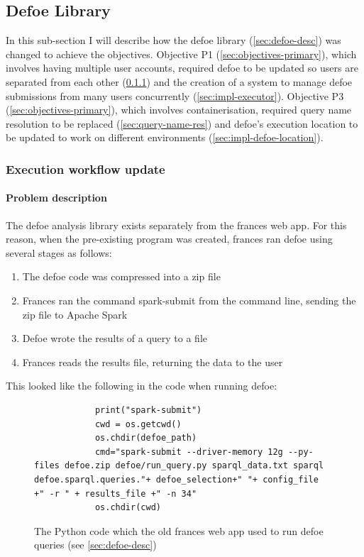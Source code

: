 \documentclass[12pt, letterpaper]{article}
\begin{document}
\subsection{Defoe Library}\label{sec:impl-defoe}

\begin{flushleft}
In this sub-section I will describe how the defoe library (\ref{sec:defoe-desc}) was changed to achieve the objectives. Objective P1 (\ref{sec:objectives-primary}), which involves having multiple user accounts, required defoe to be updated so users are separated from each other (\ref{sec:impl-workflow-exec}) and the creation of a system to manage defoe submissions from many users concurrently (\ref{sec:impl-executor}). Objective P3 (\ref{sec:objectives-primary}), which involves containerisation, required query name resolution to be replaced (\ref{sec:query-name-res}) and defoe's execution location to be updated to work on different environments (\ref{sec:impl-defoe-location}).
\end{flushleft}

\subsubsection{Execution workflow update}\label{sec:impl-workflow-exec}

\paragraph{Problem description}
\label{sec:problem-desc}

The defoe analysis library exists separately from the frances web app. For this reason, when the pre-existing program was created, frances ran defoe using several stages as follows:
\begin{enumerate}
\item The defoe code was compressed into a zip file
\item Frances ran the command spark-submit from the command line, sending the zip file to Apache Spark
\item Defoe wrote the results of a query to a file
\item Frances reads the results file, returning the data to the user
\end{enumerate}

This looked like the following in the code when running defoe:

\begin{flushleft}
\begin{figure}[H]
\begin{verbatim}
            print("spark-submit")
            cwd = os.getcwd()
            os.chdir(defoe_path)
            cmd="spark-submit --driver-memory 12g --py-files defoe.zip defoe/run_query.py sparql_data.txt sparql defoe.sparql.queries."+ defoe_selection+" "+ config_file  +" -r " + results_file +" -n 34"
            os.chdir(cwd)
\end{verbatim}
\caption{The Python code which the old frances web app used to run defoe queries (see \ref{sec:defoe-desc})}
\end{figure}
\end{flushleft}
\end{document}
